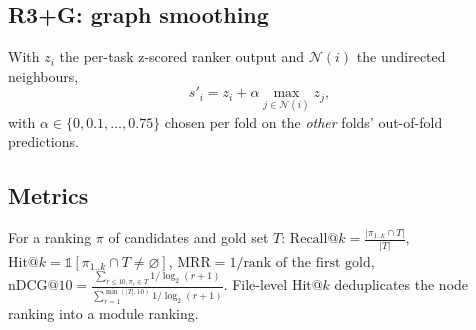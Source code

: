 \documentclass[10pt,a4paper]{article}
\newcommand{\1}{\mathbb{1}}
\begin{document}
\subsection{R3+G: graph smoothing}
With $z_i$ the per-task z-scored ranker output and $\mathcal N(i)$ the undirected neighbours,
\[
s'_i=z_i+\alpha\max_{j\in\mathcal N(i)} z_j ,
\]
with $\alpha\in\{0,0.1,\dots,0.75\}$ chosen per fold on the \emph{other} folds' out-of-fold predictions.

\subsection{Metrics}
For a ranking $\pi$ of candidates and gold set $T$:
$\text{Recall@}k=\frac{|\pi_{1..k}\cap T|}{|T|}$, $\text{Hit@}k=\1[\pi_{1..k}\cap T\neq\varnothing]$,
$\text{MRR}=1/\text{rank of the first gold}$, $\text{nDCG@10}=\frac{\sum_{r\le10,\pi_r\in T}1/\log_2(r+1)}{\sum_{r=1}^{\min(|T|,10)}1/\log_2(r+1)}$.
File-level Hit@$k$ deduplicates the node ranking into a module ranking.
\end{document}
